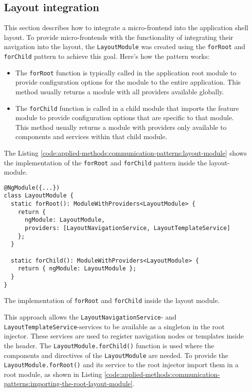 \subsection{Layout integration}\label{subsection:applied-methods:communication-patterns:layout-integration}

This section describes how to integrate a micro-frontend into the application shell layout. To provide micro-frontends with the functionality of integrating their navigation into the layout, the \texttt{LayoutModule} was created using the \texttt{forRoot} and \texttt{forChild} pattern to achieve this goal. Here's how the pattern works:

\begin{itemize}
  \item The \texttt{forRoot} function is typically called in the application root module to provide configuration options for the module to the entire application. This method usually returns a module with all providers available globally.
  \item The \texttt{forChild} function is called in a child module that imports the feature module to provide configuration options that are specific to that module. This method usually returns a module with providers only available to components and services within that child module.
\end{itemize}

\noindent The Listing \ref{code:applied-methods:communication-patterns:layout-module} shows the implementation of the \texttt{forRoot} and \texttt{forChild} pattern inside the layout-module.

\ifshowListings
\begin{listing}[H]
  \begin{verbatim}
@NgModule({...})
class LayoutModule {
  static forRoot(): ModuleWithProviders<LayoutModule> {
    return {
      ngModule: LayoutModule,
      providers: [LayoutNavigationService, LayoutTemplateService]
    };
  }

  static forChild(): ModuleWithProviders<LayoutModule> {
    return { ngModule: LayoutModule };
  }
}
  \end{verbatim}
  \caption{The implementation of \texttt{forRoot} and \texttt{forChild} inside the layout module.}\label{code:applied-methods:communication-patterns:layout-module}
\end{listing}
\fi

\noindent This approach allows the \texttt{LayoutNavigationService}- and \texttt{LayoutTemplateService}-services to be available as a singleton in the root injector. These services are used to register navigation nodes or templates inside the header. The \texttt{LayoutModule.forChild()} function is used where the components and directives of the \texttt{LayoutModule} are needed. To provide the \texttt{LayoutModule.forRoot()} and its service to the root injector import them in a root module, as shown in Listing \ref{code:applied-methods:communication-patterns:importing-the-root-layout-module}.

